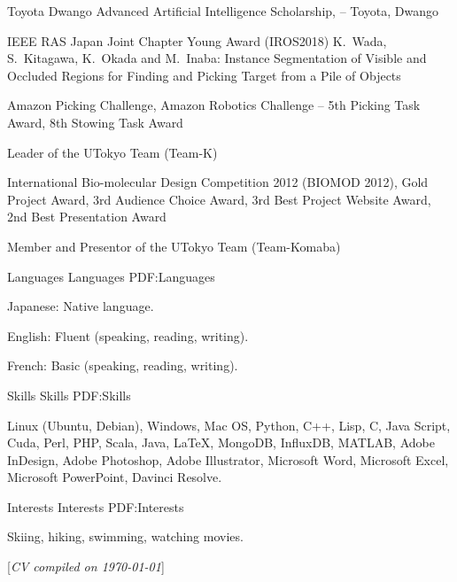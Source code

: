 \documentclass[letterpaper,MMMyyyy,nonstopmode]{simpleresumecv}
\newcommand{\CVNote}{CV compiled on {\today}}
\begin{document}
\begin{Body}
\BulletItem
Toyota Dwango Advanced Artificial Intelligence Scholarship,
\hfill
{} --
\newline
Toyota, Dwango

 IEEE RAS Japan Joint Chapter Young Award (IROS2018)
\hfill
{}
\newline
K.~Wada, S.~Kitagawa, K.~Okada and M.~Inaba: Instance Segmentation of Visible and
Occluded Regions for Finding and Picking Target from a Pile of Objects

\BulletItem
Amazon Picking Challenge, Amazon Robotics Challenge
\hfill
{} --
\newline
5th Picking Task Award, 8th Stowing Task Award
\begin{Detail}
\Item
Leader of the UTokyo Team (Team-K)
\end{Detail}

\BulletItem
International Bio-molecular Design Competition 2012 (BIOMOD 2012),
\hfill
{}
\newline
Gold Project Award, 3rd Audience Choice Award, 3rd Best Project Website Award, 2nd Best Presentation Award
\begin{Detail}
\Item
Member and Presentor of the UTokyo Team (Team-Komaba)
\end{Detail}

\Gap


\Section
{Languages}
{Languages}
{PDF:Languages}

\BulletItem
Japanese: Native language.

\Gap
\BulletItem
English: Fluent (speaking, reading, writing).

\Gap
\BulletItem
French: Basic (speaking, reading, writing).


\Section
{Skills}
{Skills}
{PDF:Skills}

\Entry
Linux (Ubuntu, Debian),
Windows,
Mac OS,
Python,
C++,
Lisp,
C,
Java Script,
Cuda,
Perl,
PHP,
Scala,
Java,
{\LaTeX},
MongoDB,
InfluxDB,
MATLAB,
Adobe InDesign,
Adobe Photoshop,
Adobe Illustrator,
Microsoft Word,
Microsoft Excel,
Microsoft PowerPoint,
Davinci Resolve.


\Section
{Interests}
{Interests}
{PDF:Interests}

\Entry
Skiing,
hiking,
swimming,
watching movies.

\end{Body}


\BigGap
\UseNoteFont%
\null\hfill%
[\textit{\CVNote}]
\end{document}

